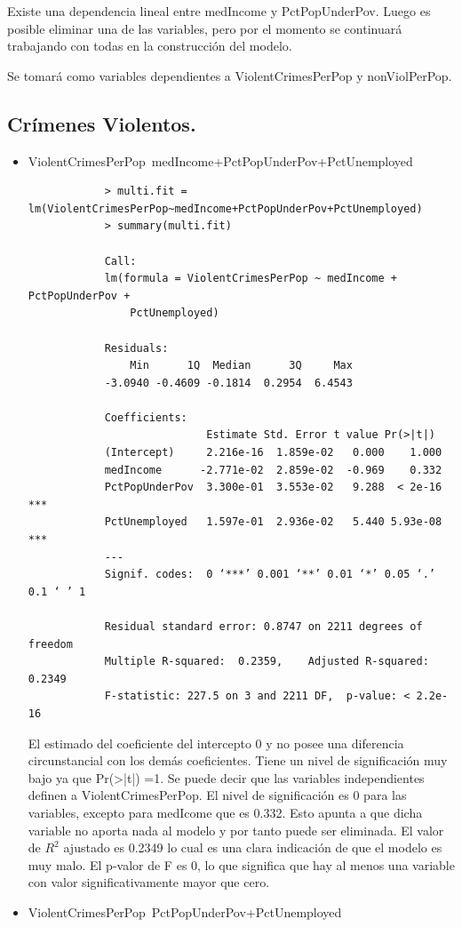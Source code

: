 \documentclass[a4paper,10pt,twocolumn]{article}
\begin{document}
Existe una dependencia lineal entre medIncome y PctPopUnderPov. Luego es posible
eliminar una de las variables, pero por el momento se continuará trabajando con todas en
la construcción del modelo.

Se tomará como variables dependientes a ViolentCrimesPerPop y nonViolPerPop.
\subsection*{Crímenes Violentos.}
\begin{itemize}
	\item {ViolentCrimesPerPop~medIncome+PctPopUnderPov+PctUnemployed}

		\begin{verbatim}
			> multi.fit = lm(ViolentCrimesPerPop~medIncome+PctPopUnderPov+PctUnemployed)
			> summary(multi.fit)

			Call:
			lm(formula = ViolentCrimesPerPop ~ medIncome + PctPopUnderPov + 
				PctUnemployed)

			Residuals:
				Min      1Q  Median      3Q     Max 
			-3.0940 -0.4609 -0.1814  0.2954  6.4543 

			Coefficients:
							Estimate Std. Error t value Pr(>|t|)    
			(Intercept)     2.216e-16  1.859e-02   0.000    1.000    
			medIncome      -2.771e-02  2.859e-02  -0.969    0.332    
			PctPopUnderPov  3.300e-01  3.553e-02   9.288  < 2e-16 ***
			PctUnemployed   1.597e-01  2.936e-02   5.440 5.93e-08 ***
			---
			Signif. codes:  0 ‘***’ 0.001 ‘**’ 0.01 ‘*’ 0.05 ‘.’ 0.1 ‘ ’ 1

			Residual standard error: 0.8747 on 2211 degrees of freedom
			Multiple R-squared:  0.2359,	Adjusted R-squared:  0.2349 
			F-statistic: 227.5 on 3 and 2211 DF,  p-value: < 2.2e-16
		\end{verbatim}

	El estimado del coeficiente del intercepto 0 y no posee una diferencia circunstancial con los demás coeficientes. Tiene un nivel de significación muy bajo ya que Pr(>|t|) =1.
	Se puede decir que las variables independientes definen a ViolentCrimesPerPop. El nivel de significación es 0 para las variables, excepto para medIcome que es 0.332. Esto apunta a que dicha variable no aporta nada al modelo y por tanto puede ser eliminada. El valor de $R^2$ ajustado es 0.2349 lo cual es una clara indicación de que el modelo es muy malo. El p-valor de F es 0, lo que significa que hay al menos una variable con valor significativamente mayor que cero.

	\item {ViolentCrimesPerPop~PctPopUnderPov+PctUnemployed}


\end{itemize}
\end{document}
